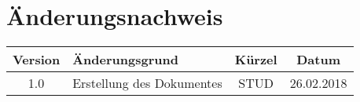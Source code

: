 \section*{Änderungsnachweis}
\begin{tabular}{|c|p{10cm}|c|c|}
    \hline
    Version & Änderungsgrund & Kürzel& Datum\\ \hline
    1.0 & Erstellung des Dokumentes & STUD & 26.02.2018\\ \hline
\end{tabular}